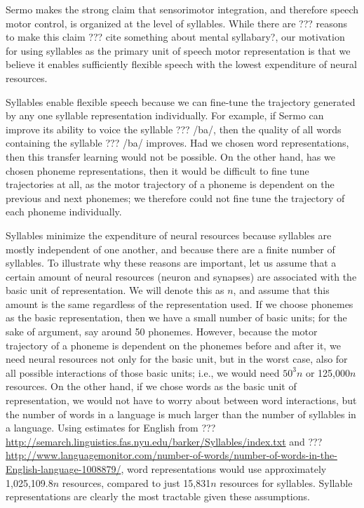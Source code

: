 Sermo makes the strong claim
that sensorimotor integration,
and therefore speech motor control,
is organized at the level of syllables.
While there are ??? reasons
to make this claim
??? cite something about mental syllabary?,
our motivation for using syllables
as the primary unit
of speech motor representation
is that we believe
it enables sufficiently flexible speech
with the lowest expenditure of neural resources.

Syllables enable flexible speech
because we can fine-tune the
trajectory generated by any
one syllable representation individually.
For example,
if Sermo can improve its ability
to voice the syllable ??? /ba/,
then the quality of all words
containing the syllable ??? /ba/
improves.
Had we chosen word representations,
then this transfer learning
would not be possible.
On the other hand,
has we chosen phoneme representations,
then it would be difficult
to fine tune trajectories at all,
as the motor trajectory of a phoneme
is dependent on the
previous and next phonemes;
we therefore could not fine tune
the trajectory of each phoneme individually.

Syllables minimize the expenditure of neural resources
because syllables are mostly independent of one another,
and because there are a finite number of syllables.
To illustrate why these reasons are important,
let us assume that a certain amount of
neural resources (neuron and synapses)
are associated with the basic unit of representation.
We will denote this as $n$,
and assume that this amount is the same
regardless of the representation used.
If we choose phonemes as the basic representation,
then we have a small number of basic units;
for the sake of argument,
say around 50 phonemes.
However, because the motor trajectory
of a phoneme is dependent on the
phonemes before and after it,
we need neural resources not only for
the basic unit, but in the worst case,
also for all possible
interactions of those basic units;
i.e., we would need $50^3n$ or 125,000$n$ resources.
On the other hand, if we chose
words as the basic unit of representation,
we would not have to worry about
between word interactions,
but the number of words in a language
is much larger than the number of syllables
in a language.
Using estimates for English
from ??? \url{http://semarch.linguistics.fas.nyu.edu/barker/Syllables/index.txt}
and ??? \url{http://www.languagemonitor.com/number-of-words/number-of-words-in-the-English-language-1008879/},
word representations would use approximately
1,025,109.8$n$ resources,
compared to just 15,831$n$ resources for syllables.
Syllable representations are clearly the most tractable
given these assumptions.

